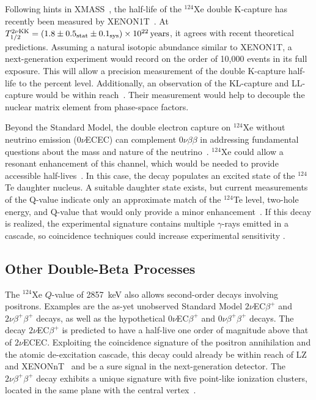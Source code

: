 Following hints in XMASS~\cite{Abe:2018gyq}, the half-life of the $^{124}$Xe double K-capture has recently been measured by XENON1T~\cite{XENON:2019dti}. At $T_{1/2}^{2\nu\text{KK}} = (1.8 \pm 0.5_\text{stat} \pm 0.1_\text{sys}) \times 10^{22}\, \mathrm{years}$, it agrees with recent theoretical predictions. Assuming a natural isotopic abundance similar to XENON1T, a next-generation experiment would record on the order of 10,000 events in its full exposure. This will allow a precision measurement of the double K-capture half-life to the percent level. Additionally, an observation of the KL-capture and LL-capture would be within reach~\cite{Doi:1991xf}. Their measurement would help to decouple the nuclear matrix element from phase-space factors.

Beyond the Standard Model, the double electron capture on $^{124}$Xe without neutrino emission ($0\nu$ECEC) can complement $0\nu\beta\beta$ in addressing fundamental questions about the mass and nature of the neutrino~\cite{Bernabeu:1983yb,Sujkowski:2003mb}. $^{124}$Xe could allow a resonant enhancement of this channel, which would be needed to provide accessible half-lives~\cite{Kotila:2014zya}. In this case, the decay populates an excited state of the $^{124}$Te daughter nucleus. A suitable daughter state exists, but current measurements of the Q-value indicate only an approximate match of the $^{124}$Te level, two-hole energy, and Q-value that would only provide a minor enhancement~\cite{Nesterenko:2012xp}. If this decay is realized, the experimental signature contains multiple $\gamma$-rays emitted in a cascade, so coincidence techniques could increase experimental sensitivity \cite{Wittweg:2020fak}.

\subsection{Other Double-Beta Processes}

The $^{124}$Xe $Q$-value of 2857~keV also allows second-order decays involving positrons. Examples are the as-yet unobserved Standard Model $2\nu$EC$\beta^+$ and $2\nu\beta^+\beta^+$ decays, as well as the hypothetical $0\nu$EC$\beta^+$ and $0\nu\beta^+\beta^+$ decays. The decay $2\nu$EC$\beta^+$ is predicted to have a half-live one order of magnitude above that of $2\nu$ECEC. Exploiting the coincidence signature of the positron annihilation and the atomic de-excitation cascade, this decay could already be within reach of LZ and XENONnT~\cite{Barros:2014exa, Wittweg:2020fak} and be a sure signal in the next-generation detector. The $2\nu\beta^+\beta^+$ decay exhibits a unique signature with five point-like ionization clusters, located in the same plane with the central vertex~\cite{Bolozdynya:1997pdbd}.

